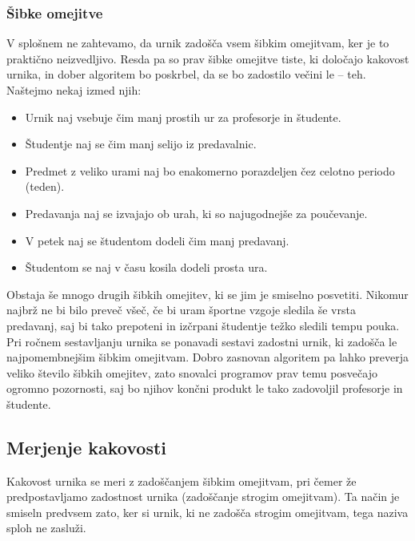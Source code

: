 \documentclass[a4paper, 10pt]{article}
\begin{document}
\subsubsection{Šibke omejitve}

V splošnem ne zahtevamo, da urnik zadošča vsem šibkim omejitvam, ker je to praktično neizvedljivo.
Resda pa so prav šibke omejitve tiste, ki določajo kakovost urnika, in dober algoritem bo
poskrbel, da se bo zadostilo večini le -- teh. Naštejmo nekaj izmed njih:

\begin{itemize}
   \item Urnik naj vsebuje čim manj prostih ur za profesorje in študente.
   \item Študentje naj se čim manj selijo iz predavalnic.
   \item Predmet z veliko urami naj bo enakomerno porazdeljen čez celotno periodo (teden).
   \item Predavanja naj se izvajajo ob urah, ki so najugodnejše za poučevanje.
   \item V petek naj se študentom dodeli čim manj predavanj.
   \item Študentom se naj v času kosila dodeli prosta ura.
\end{itemize}

Obstaja še mnogo drugih šibkih omejitev, ki se jim je smiselno posvetiti. Nikomur najbrž ne
bi bilo preveč všeč, če bi uram športne vzgoje sledila še vrsta predavanj, saj bi tako
prepoteni in izčrpani študentje težko sledili tempu pouka.
Pri ročnem sestavljanju urnika se ponavadi sestavi zadostni urnik, ki zadošča le
najpomembnejšim šibkim omejitvam. Dobro zasnovan algoritem pa lahko preverja veliko
število šibkih omejitev, zato snovalci programov prav temu posvečajo ogromno pozornosti,
saj bo njihov končni produkt le tako zadovoljil profesorje in študente.

\subsection{Merjenje kakovosti}

Kakovost urnika se meri z zadoščanjem šibkim omejitvam, pri čemer že predpostavljamo
zadostnost urnika (zadoščanje strogim omejitvam). Ta način je smiseln predvsem zato,
ker si urnik, ki ne zadošča strogim omejitvam, tega naziva sploh ne zasluži.
\end{document}
